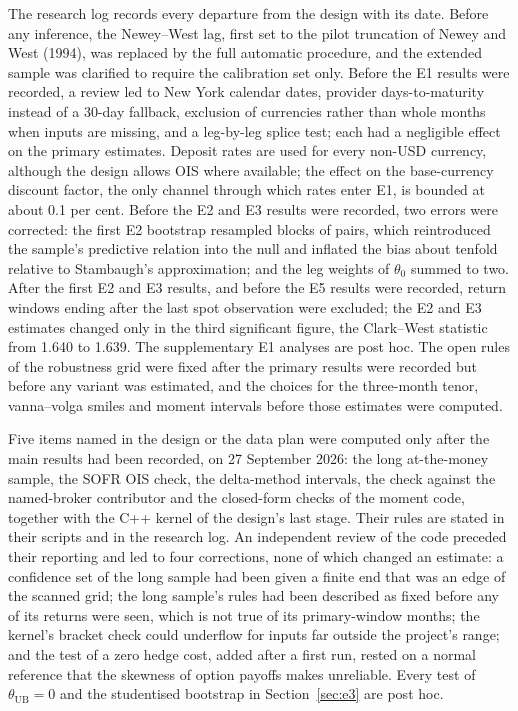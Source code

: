 \documentclass[11pt]{article}
\theoremstyle{result}
\newcommand{\thUB}{\theta_{\mathrm{UB}}}
\begin{document}
The research log records every departure from the design with its date. Before any inference, the Newey--West lag, first set to the pilot truncation of Newey and West (1994), was replaced by the full automatic procedure, and the extended sample was clarified to require the calibration set only. Before the E1 results were recorded, a review led to New York calendar dates, provider days-to-maturity instead of a 30-day fallback, exclusion of currencies rather than whole months when inputs are missing, and a leg-by-leg splice test; each had a negligible effect on the primary estimates. Deposit rates are used for every non-USD currency, although the design allows OIS where available; the effect on the base-currency discount factor, the only channel through which rates enter E1, is bounded at about 0.1 per cent. Before the E2 and E3 results were recorded, two errors were corrected: the first E2 bootstrap resampled blocks of pairs, which reintroduced the sample's predictive relation into the null and inflated the bias about tenfold relative to Stambaugh's approximation; and the leg weights of $\theta_0$ summed to two. After the first E2 and E3 results, and before the E5 results were recorded, return windows ending after the last spot observation were excluded; the E2 and E3 estimates changed only in the third significant figure, the Clark--West statistic from 1.640 to 1.639. The supplementary E1 analyses are post hoc. The open rules of the robustness grid were fixed after the primary results were recorded but before any variant was estimated, and the choices for the three-month tenor, vanna--volga smiles and moment intervals before those estimates were computed.

Five items named in the design or the data plan were computed only after the main results had been recorded, on 27 September 2026: the long at-the-money sample, the SOFR OIS check, the delta-method intervals, the check against the named-broker contributor and the closed-form checks of the moment code, together with the C++ kernel of the design's last stage. Their rules are stated in their scripts and in the research log. An independent review of the code preceded their reporting and led to four corrections, none of which changed an estimate: a confidence set of the long sample had been given a finite end that was an edge of the scanned grid; the long sample's rules had been described as fixed before any of its returns were seen, which is not true of its primary-window months; the kernel's bracket check could underflow for inputs far outside the project's range; and the test of a zero hedge cost, added after a first run, rested on a normal reference that the skewness of option payoffs makes unreliable. Every test of $\thUB=0$ and the studentised bootstrap in Section~\ref{sec:e3} are post hoc.
\end{document}
